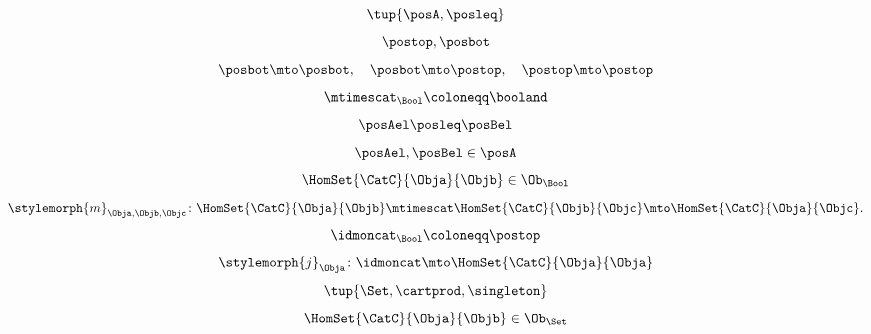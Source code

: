{\begin{forslides}
\begin{equation*}
            \tup{\posA,\posleq}
        \end{equation*}
        \begin{equation*}
            \label{eq:poset_bool_b}
            \postop,\posbot
        \end{equation*}
        \begin{equation*}
            \label{eq:poset_bool_c}
            \posbot\mto \posbot, \quad \posbot\mto \postop, \quad \postop\mto \postop
        \end{equation*}
        \begin{equation*}
            \label{eq:poset_bool_d}
            \mtimescat_\Bool \coloneqq \booland
        \end{equation*}
        \begin{equation*}
            \label{eq:poset_bool_e}
            \posAel\posleq \posBel
        \end{equation*}
        \begin{equation*}
            \label{eq:poset_bool_f}
            \posAel,\posBel \in \posA
        \end{equation*}
        \begin{equation*}
            \label{eq:poset_bool_g}
            \HomSet{\CatC}{\Obja}{\Objb}\in \Ob_\Bool
        \end{equation*}
        \begin{equation*}
            \label{eq:poset_bool_h}
            \stylemorph{m}_{\Obja,\Objb,\Objc}\colon \HomSet{\CatC}{\Obja}{\Objb}\mtimescat \HomSet{\CatC}{\Objb}{\Objc}\mto \HomSet{\CatC}{\Obja}{\Objc}.
        \end{equation*}
        \begin{equation*}
            \label{eq:poset_bool_i}
            \idmoncat_\Bool \coloneqq \postop
        \end{equation*}
        \begin{equation*}
            \label{eq:poset_bool_k}
            \stylemorph{j}_\Obja\colon \idmoncat \mto \HomSet{\CatC}{\Obja}{\Obja}
        \end{equation*}
        \begin{equation*}
            \label{eq:poset_bool_j}
            \tup{\Set, \cartprod, \singleton}
        \end{equation*}
        \begin{equation*}
            \label{eq:poset_bool_l}
            \HomSet{\CatC}{\Obja}{\Objb}\in \Ob_\Set
        \end{equation*}
        \begin{equation*}

\end{equation*}
\end{forslides}}
